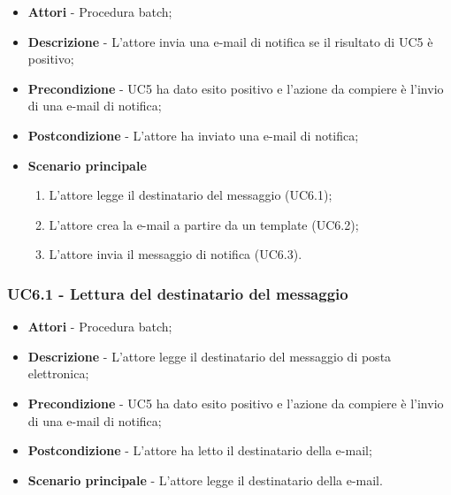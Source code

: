                 \begin{itemize}

                    \item \textbf{Attori} - Procedura batch;
                    \item \textbf{Descrizione} - L'attore invia una e-mail di notifica se il risultato di UC5 è positivo;
                    \item \textbf{Precondizione} - UC5 ha dato esito positivo e l'azione da compiere è l'invio di una e-mail di notifica;
                    \item \textbf{Postcondizione} - L'attore ha inviato una e-mail di notifica;
                    \item \textbf{Scenario principale}
                        \begin{enumerate}

                            \item L'attore legge il destinatario del messaggio (UC6.1);
                            \item L'attore crea la e-mail a partire da un template (UC6.2);
                            \item L'attore invia il messaggio di notifica (UC6.3).

                        \end{enumerate}

                \end{itemize}

                \subsubsection{UC6.1 - Lettura del destinatario del messaggio}

                    \begin{itemize}

                        \item \textbf{Attori} - Procedura batch;
                        \item \textbf{Descrizione} - L'attore legge il destinatario del messaggio di posta elettronica;
                        \item \textbf{Precondizione} - UC5 ha dato esito positivo e l'azione da compiere è l'invio di una e-mail di notifica;
                        \item \textbf{Postcondizione} - L'attore ha letto il destinatario della e-mail;
                        \item \textbf{Scenario principale} - L'attore legge il destinatario della e-mail.

                    \end{itemize}


